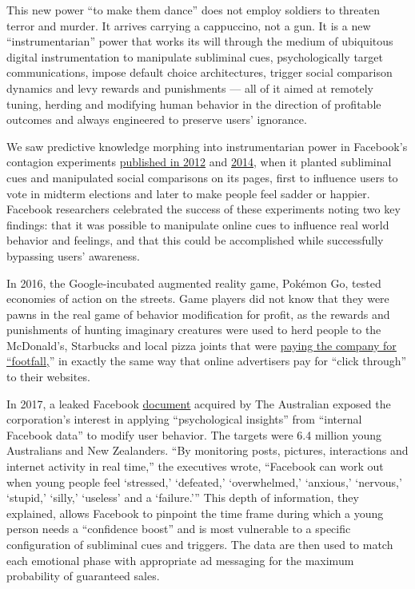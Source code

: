 This new power ``to make them dance'' does not employ soldiers to
threaten terror and murder. It arrives carrying a cappuccino, not a gun.
It is a new ``instrumentarian'' power that works its will through the
medium of ubiquitous digital instrumentation to manipulate subliminal
cues, psychologically target communications, impose default choice
architectures, trigger social comparison dynamics and levy rewards and
punishments --- all of it aimed at remotely tuning, herding and
modifying human behavior in the direction of profitable outcomes and
always engineered to preserve users' ignorance.

We saw predictive knowledge morphing into instrumentarian power in
Facebook's contagion experiments
\href{https://www.nature.com/articles/nature11421}{published in 2012}
and \href{https://www.pnas.org/content/111/24/8788}{2014}, when it
planted subliminal cues and manipulated social comparisons on its pages,
first to influence users to vote in midterm elections and later to make
people feel sadder or happier. Facebook researchers celebrated the
success of these experiments noting two key findings: that it was
possible to manipulate online cues to influence real world behavior and
feelings, and that this could be accomplished while successfully
bypassing users' awareness.

In 2016, the Google-incubated augmented reality game, Pokémon Go, tested
economies of action on the streets. Game players did not know that they
were pawns in the real game of behavior modification for profit, as the
rewards and punishments of hunting imaginary creatures were used to herd
people to the McDonald's, Starbucks and local pizza joints that were
\href{https://time.com/5602363/george-orwell-1984-anniversary-surveillance-capitalism/}{paying
the company for ``footfall,}'' in exactly the same way that online
advertisers pay for ``click through'' to their websites.

In 2017, a leaked Facebook
\href{https://www.theguardian.com/technology/2017/may/01/facebook-advertising-data-insecure-teens}{document}
acquired by The Australian exposed the corporation's interest in
applying ``psychological insights'' from ``internal Facebook data'' to
modify user behavior. The targets were 6.4 million young Australians and
New Zealanders. ``By monitoring posts, pictures, interactions and
internet activity in real time,'' the executives wrote, ``Facebook can
work out when young people feel `stressed,' `defeated,' `overwhelmed,'
`anxious,' `nervous,' `stupid,' `silly,' `useless' and a `failure.'''
This depth of information, they explained, allows Facebook to pinpoint
the time frame during which a young person needs a ``confidence boost''
and is most vulnerable to a specific configuration of subliminal cues
and triggers. The data are then used to match each emotional phase with
appropriate ad messaging for the maximum probability of guaranteed
sales.

